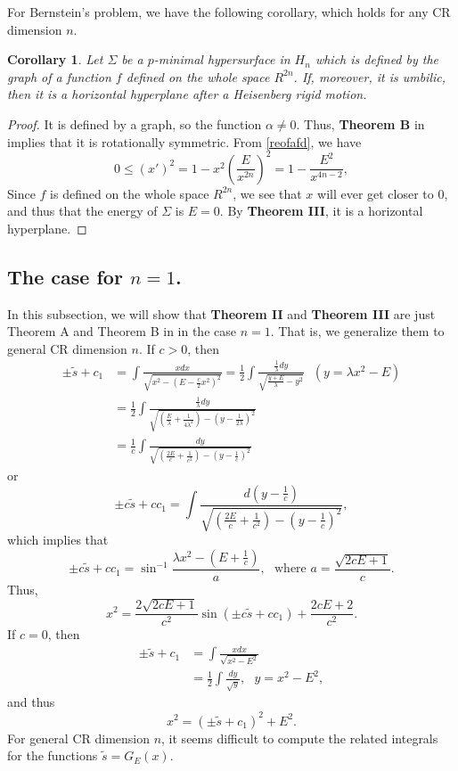 \documentclass[12pt]{amsart}
\newtheorem{cor}[thm]{\sc Corollary}
\theoremstyle{definition}\newtheorem{exa}[thm]{\sc Example}
\theoremstyle{definition}\newtheorem{de}[thm]{\sc Definition}
\theoremstyle{definition}\newtheorem{rem}[thm]{\sc Remark}
\theoremstyle{definition}\newtheorem{prob}[thm]{\it Problem}
\theoremstyle{definition}\newtheorem{fact}[thm]{\sc Fact}
\theoremstyle{definition}\newtheorem{claim}[thm]{\sc Claim}
\numberwithin{equation}{section}
\begin{document}
For Bernstein's problem, we have the following corollary, which holds for any CR dimension $n$.
\begin{cor}\label{co3}
Let $\Sigma$ be a $p$-minimal hypersurface in $H_{n}$ which is defined by the graph of a function $f$ defined on the whole space $R^{2n}$. If, moreover, it is umbilic, then it is a horizontal hyperplane after a Heisenberg rigid motion. 
\end{cor}
\begin{proof} 
It is defined by a graph, so the function $\alpha\neq0$. Thus, {\bf Theorem B} in \cite{CCHY2} implies that it is rotationally symmetric. 
From \eqref{reofafd}, we have
\begin{equation*}
0\leq (x')^{2}=1-x^{2}\left(\frac{E}{x^{2n}}\right)^{2}=1-\frac{E^{2}}{x^{4n-2}},
\end{equation*}
Since $f$ is defined on the  whole space $R^{2n}$, we see that $x$ will ever get closer to $0$, and thus that the energy of $\Sigma$ is $E=0$. By {\bf Theorem III}, it is a horizontal hyperplane.
\end{proof}


\subsection{The case for $n=1$.} In this subsection, we will show that {\bf Theorem II} and {\bf Theorem III} are just Theorem A and Theorem B in \cite{CLL} in the case $n=1$. That is, we generalize them to general CR dimension $n$.
If $c>0$, then
\begin{equation}
\begin{split}
\pm \tilde{s}+c_{1}&=\int\frac{xdx}{\sqrt{x^{2}-\left(E-\frac{c}{2}x^{2}\right)^{2}}}=\frac{1}{2}\int\frac{\frac{1}{\lambda}dy}{\sqrt{\frac{y+E}{\lambda}-y^{2}}}\ \ \ (y=\lambda x^{2}-E)\\
&=\frac{1}{2}\int\frac{\frac{1}{\lambda}dy}{\sqrt{\left(\frac{E}{\lambda}+\frac{1}{4\lambda^{2}}\right)-(y-\frac{1}{2\lambda})^{2}}}\\
&=\frac{1}{c}\int\frac{dy}{\sqrt{\left(\frac{2E}{c}+\frac{1}{c^{2}}\right)-(y-\frac{1}{c})^{2}}}
\end{split}
\end{equation}
or
\[\pm c\tilde{s}+cc_{1}=\int\frac{d\left(y-\frac{1}{c}\right)}{\sqrt{\left(\frac{2E}{c}+\frac{1}{c^{2}}\right)-(y-\frac{1}{c})^{2}}},\]
which implies that
\[\pm c\tilde{s}+cc_{1}=\sin^{-1}{\frac{\lambda x^{2}-(E+\frac{1}{c})}{a}},\ \ \ \mbox{where } a=\frac{\sqrt{2cE+1}}{c}.\]
Thus,
\[x^{2}=\frac{2\sqrt{2cE+1}}{c^{2}}\sin{(\pm c\tilde{s}+cc_{1})}+\frac{2cE+2}{c^{2}}.\]
If $c=0$, then
\[\begin{split}
\pm \tilde{s}+c_{1}&=\int\frac{xdx}{\sqrt{x^{2}-E^{2}}}\\
&=\frac{1}{2}\int\frac{dy}{\sqrt{y}},\ \ \ y=x^{2}-E^{2},
\end{split}\]
and thus
\[x^{2}=(\pm\tilde{s}+c_{1})^{2}+E^{2}.\]
For general CR dimension $n$, it seems difficult to compute the related integrals for the functions $\tilde{s}=G_{E}(x)$.
\end{document}
